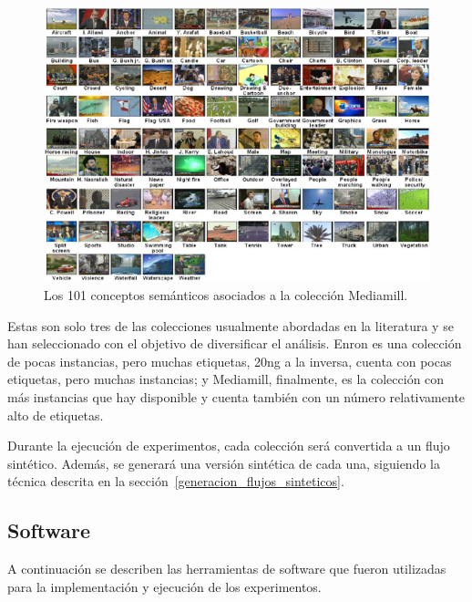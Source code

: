 \begin{figure}[htbp]
	\includegraphics[width=.9\linewidth]{figures/mediamill.jpg}
	\centering
	\caption{Los 101 conceptos semánticos asociados a la colección
		Mediamill.}
	\label{fig:mediamill}
\end{figure}

Estas son solo tres de las colecciones usualmente abordadas en la literatura y
se han seleccionado con el objetivo de diversificar el análisis. Enron es una
colección de pocas instancias, pero muchas etiquetas, 20ng a la inversa, cuenta
con pocas etiquetas, pero muchas instancias; y Mediamill, finalmente, es la
colección con más instancias que hay disponible y cuenta también con un número
relativamente alto de etiquetas.

Durante la ejecución de experimentos, cada colección será convertida a un flujo
sintético. Además, se generará una versión sintética de cada una, siguiendo la
técnica descrita en la sección~\ref{generacion_flujos_sinteticos}.

\subsection{Software}

A continuación se describen las herramientas de software que fueron utilizadas
para la implementación y ejecución de los experimentos.


